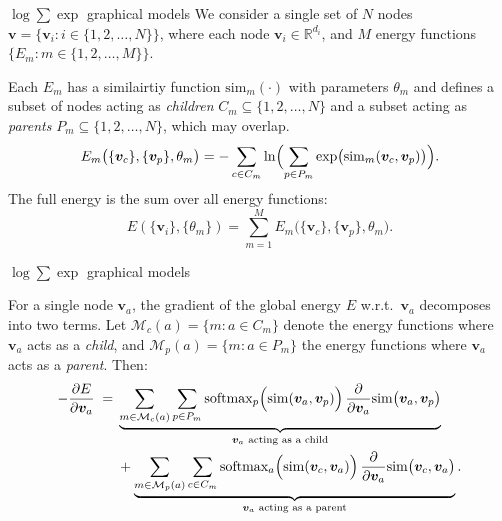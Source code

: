 \documentclass{beamer}
\begin{document}
\begin{frame}{$\log \sum \exp$ graphical models}
    We consider a single set of \(N\) nodes \(\bm{v} = \{\bm{v}_i : i \in \{1, 2, \ldots, N\}\}\), where each node \(\bm{v}_i \in \mathbb{R}^{d_i}\), and \(M\) energy functions \(\{E_m : m \in \{1, 2, \ldots, M\}\}\).

    \bigskip
    
    Each \(E_m\) has a similairtiy function $\mathrm{sim}_{m}(\cdot)$ with parameters \(\theta_m\) and defines a subset of nodes acting as \emph{children} \(C_m \subseteq \{1, 2, \ldots, N\}\) and a subset acting as \emph{parents} \(P_m \subseteq \{1, 2, \ldots, N\}\), which may overlap.
    \[
    E_m\bigl(\{\bm{v}_c\}, \{\bm{v}_p\}, \theta_m\bigr) = -\sum_{c \in C_m} \ln \Bigl(\sum_{p \in P_m} \exp\bigl(\mathrm{sim}_{m}(\bm{v}_c, \bm{v}_p)\bigr)\Bigr).
    \]
    The full energy is the sum over all energy functions:
    \[
    E(\{\bm{v}_i\}, \{\theta_m\}) = \sum_{m=1}^{M} E_m\bigl(\{\bm{v}_c\}, \{\bm{v}_p\}, \theta_m\bigr).
    \]

\end{frame}

\begin{frame}{$\log \sum \exp$ graphical models}
    
    For a single node \(\bm{v}_a\), the gradient of the global energy \(E\) w.r.t.\ \(\bm{v}_a\) decomposes into two terms. Let \(\mathcal{M}_c(a) = \{m : a \in C_m\}\) denote the energy functions where \(\bm{v}_a\) acts as a \emph{child}, and \(\mathcal{M}_p(a) = \{m : a \in P_m\}\) the energy functions where \(\bm{v}_a\) acts as a \emph{parent}. Then:
   \begin{equation}
   \begin{aligned}
   -\frac{\partial E}{\partial \bm{v}_a}
   \;=\;&
   \underbrace{
   \sum_{m \in \mathcal{M}_c(a)} \sum_{p \in P_m}
   \text{softmax}_{p} \Bigl(\mathrm{sim}(\bm{v}_a, \bm{v}_p)\Bigr)\,
   \frac{\partial}{\partial \bm{v}_a}
   \mathrm{sim}\bigl(\bm{v}_a, \bm{v}_p\bigr)
   }_{\text{\(\bm{v}_a\) acting as a child}} \\
   &+
   \underbrace{
   \sum_{m \in \mathcal{M}_p(a)} \sum_{c \in C_m}
   \text{softmax}_{a} \Bigl(\mathrm{sim}(\bm{v}_c, \bm{v}_a)\Bigr)\,
   \frac{\partial}{\partial \bm{v}_a}
   \mathrm{sim}\bigl(\bm{v}_c, \bm{v}_a\bigr)
   }_{\text{\(\bm{v}_a\) acting as a parent}}.
   \end{aligned}
   \end{equation}
   \end{frame}
   
\end{document}
